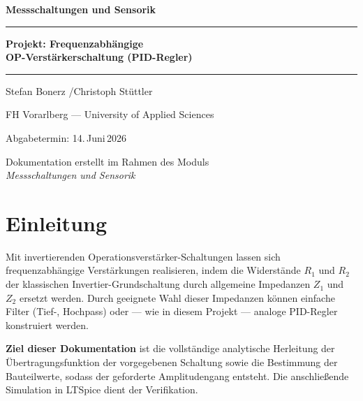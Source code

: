 \documentclass[12pt,a4paper]{article}
\begin{document}

\begin{titlepage}
  \centering
  \vspace*{1cm}
  {\Huge\bfseries\color{fhblau} Messschaltungen und Sensorik\par}
  \vspace{0.5cm}
  \rule{\linewidth}{2pt}
  \vspace{0.5cm}
  {\LARGE\bfseries Projekt: Frequenzabhängige\\[4pt]
   OP-Verstärkerschaltung (PID-Regler)\par}
  \vspace{0.5cm}
  \rule{\linewidth}{1pt}
  \vspace{1.5cm}
  {\large Stefan Bonerz \quad/\quad Christoph Stüttler\par}
  \vspace{0.5cm}
  {\large FH Vorarlberg --- University of Applied Sciences\par}
  \vspace{0.5cm}
  {\large Abgabetermin: 14.\,Juni\,2026\par}
  \vfill
  {\normalsize\color{gray} Dokumentation erstellt im Rahmen des Moduls\\
   \textit{Messschaltungen und Sensorik}}
\end{titlepage}

\tableofcontents
\newpage
{}

\section{Einleitung}

Mit invertierenden Operationsverstärker-Schaltungen lassen sich frequenz\-abhängige
Verstärkungen realisieren, indem die Widerstände $R_1$ und $R_2$ der klassischen
Invertier-Grund\-schaltung durch allgemeine Impedanzen $Z_1$ und $Z_2$ ersetzt werden.
Durch geeignete Wahl dieser Impedanzen können einfache Filter (Tief-, Hochpass) oder ---
wie in diesem Projekt --- analoge PID-Regler konstruiert werden.

\textbf{Ziel dieser Dokumentation} ist die vollständige analytische Herleitung der
Übertragungsfunktion der vorgegebenen Schaltung sowie die Bestimmung der Bauteilwerte,
sodass der geforderte Amplitudengang entsteht. Die anschließende Simulation in LTSpice
dient der Verifikation.
\end{document}
